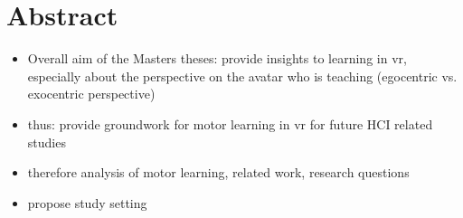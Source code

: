 \chapter{Abstract}
\begin{itemize}
	\item Overall aim of the Masters theses: provide insights to learning in vr, especially about the perspective on the avatar who is teaching (egocentric vs. exocentric perspective)	
	\item thus: provide groundwork for motor learning in vr for future HCI related studies
	\item therefore analysis of motor learning, related work, research questions
	\item propose study setting
\end{itemize}